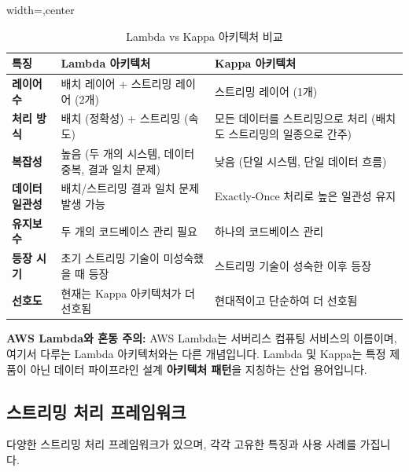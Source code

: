\documentclass[11pt,a4paper]{article}
\theoremstyle{definition}
\begin{document}
\begin{table}[htbp]
\centering
\caption{Lambda vs Kappa 아키텍처 비교}
\label{tab:lambda_vs_kappa}
\begin{adjustbox}{width=\textwidth,center}
\begin{tabular}{lll}
\toprule
\textbf{특징} & \textbf{Lambda 아키텍처} & \textbf{Kappa 아키텍처} \\
\midrule
\textbf{레이어 수} & 배치 레이어 + 스트리밍 레이어 (2개) & 스트리밍 레이어 (1개) \\
\textbf{처리 방식} & 배치 (정확성) + 스트리밍 (속도) & 모든 데이터를 스트리밍으로 처리 (배치도 스트리밍의 일종으로 간주) \\
\textbf{복잡성} & 높음 (두 개의 시스템, 데이터 중복, 결과 일치 문제) & 낮음 (단일 시스템, 단일 데이터 흐름) \\
\textbf{데이터 일관성} & 배치/스트리밍 결과 일치 문제 발생 가능 & Exactly-Once 처리로 높은 일관성 유지 \\
\textbf{유지보수} & 두 개의 코드베이스 관리 필요 & 하나의 코드베이스 관리 \\
\textbf{등장 시기} & 초기 스트리밍 기술이 미성숙했을 때 등장 & 스트리밍 기술이 성숙한 이후 등장 \\
\textbf{선호도} & 현재는 Kappa 아키텍처가 더 선호됨 & 현대적이고 단순하여 더 선호됨 \\
\bottomrule
\end{tabular}
\end{adjustbox}
\end{table}

\begin{warningbox}
\textbf{AWS Lambda와 혼동 주의:} AWS Lambda는 서버리스 컴퓨팅 서비스의 이름이며, 여기서 다루는 Lambda 아키텍처와는 다른 개념입니다. Lambda 및 Kappa는 특정 제품이 아닌 데이터 파이프라인 설계 \textbf{아키텍처 패턴}을 지칭하는 산업 용어입니다.
\end{warningbox}

\subsection{스트리밍 처리 프레임워크}

다양한 스트리밍 처리 프레임워크가 있으며, 각각 고유한 특징과 사용 사례를 가집니다.
\end{document}
